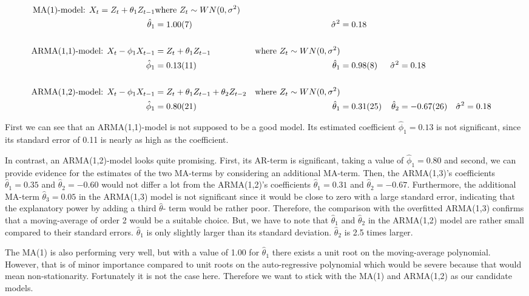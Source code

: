 \documentclass[11pt,a4paper]{article}
\begin{document}
\begin{align*}
   \text{MA(1)-model: } X_t = Z_t + \theta_1 Z_{t-1}
    & \text{where ${Z_t} \sim WN(0,\sigma^2)$}  \\
\hat{\theta}_1  &= \num{ 1.00 \pm 0.07}  &  \hat{\sigma}^2  &= \num{ 0.18 }
\\
\\
    \text{ARMA(1,1)-model: }X_t - \phi_1 X_{t-1} &= Z_t + \theta_1 Z_{t-1}
    & \text{where ${Z_t} \sim WN(0,\sigma^2)$} \\
\hat{\phi}_1    &= \num{ 0.13 \pm 0.11}  &  \hat{\theta}_1  &= \num{ 0.98 \pm 0.08}  &  \hat{\sigma}^2  &= \num{ 0.18 }
\\
\\
    \text{ARMA(1,2)-model: }X_t - \phi_1 X_{t-1} &= Z_t + \theta_1 Z_{t-1} + \theta_2 Z_{t-2}
    & \text{where ${Z_t} \sim WN(0,\sigma^2)$} \\
\hat{\phi}_1    &= \num{ 0.80 \pm 0.21}  &  \hat{\theta}_1  &= \num{ 0.31 \pm 0.25} & \hat{\theta}_2  &= \num{-0.67 \pm 0.26}  &  \hat{\sigma}^2  &= \num{0.18}   
\end{align*}

First we can see that an ARMA(1,1)-model is not supposed to be a good model.
Its estimated coefficient $\hat{\phi}_1=0.13$ is not significant, since its standard error of 0.11 is nearly as high as the coefficient.

In contrast, an ARMA(1,2)-model looks quite promising.
First, its AR-term is significant, taking a value of $\hat{\phi}_1=0.80$ and second, we can provide evidence for the estimates of the two MA-terms by considering an additional MA-term.
Then, the ARMA(1,3)'s coefficients $\hat{\theta}_1 = 0.35$ and $\hat{\theta}_2= -0.60$ would not differ a lot from the ARMA(1,2)'s coefficients $\hat{\theta}_1 = 0.31$ and $\hat{\theta}_2 = -0.67$.
Furthermore, the additional MA-term $\hat{\theta}_3 = 0.05$ in the ARMA(1,3) model is not significant since it would be close to zero with a large standard error, indicating that the explanatory power by adding a third $\hat{\theta}$- term would be rather poor.
Therefore, the comparison with the overfitted ARMA(1,3) confirms that a moving-average of order 2 would be a suitable choice.
But, we have to note that $\hat{\theta}_1$ and $\hat{\theta}_2$ in the ARMA(1,2) model are rather small compared to their standard errors.
$\hat{\theta}_1$ is only slightly larger than its standard deviation.
$\hat{\theta}_2$ is 2.5 times larger.

The MA(1) is also performing very well, but with a value of 1.00 for $\hat{\theta}_1$ there exists a unit root on the moving-average polynomial.
However, that is of minor importance compared to unit roots on the auto-regressive polynomial \cite[p.~42--83]{bd02} which would be severe because that would mean non-stationarity.
Fortunately it is not the case here.
Therefore we want to stick with the MA(1) and ARMA(1,2) as our candidate models.
\end{document}
